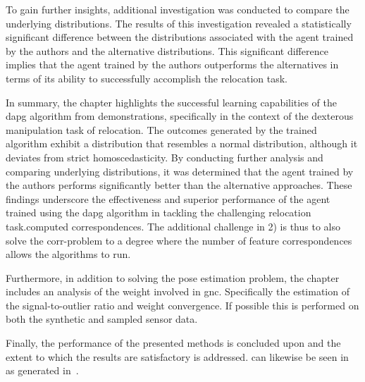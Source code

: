 To gain further insights, additional investigation was conducted to compare the underlying distributions. The results of this investigation revealed a statistically significant difference between the distributions associated with the agent trained by the authors and the alternative distributions. This significant difference implies that the agent trained by the authors outperforms the alternatives in terms of its ability to successfully accomplish the relocation task.\medskip

In summary, the chapter highlights the successful learning capabilities of the \gls{dapg} algorithm from demonstrations, specifically in the context of the dexterous manipulation task of relocation. The outcomes generated by the trained algorithm exhibit a distribution that resembles a normal distribution, although it deviates from strict homoscedasticity. By conducting further analysis and comparing underlying distributions, it was determined that the agent trained by the authors performs significantly better than the alternative approaches. These findings underscore the effectiveness and superior performance of the agent trained using the \gls{dapg} algorithm in tackling the challenging relocation task.computed correspondences. The additional challenge in 2) is thus to also solve the \gls{corr-problem} to a degree where the number of feature correspondences allows the algorithms to run. \medskip

Furthermore, in addition to solving the pose estimation problem, the chapter includes an analysis of the weight involved in \gls{gnc}. Specifically the estimation of the signal-to-outlier ratio and weight convergence. If possible this is performed on both the synthetic and sampled sensor data. \medskip

Finally, the performance of the presented methods is concluded upon and the extent to which the results are satisfactory is addressed.  can likewise be seen in~ as generated in~. \medskip

